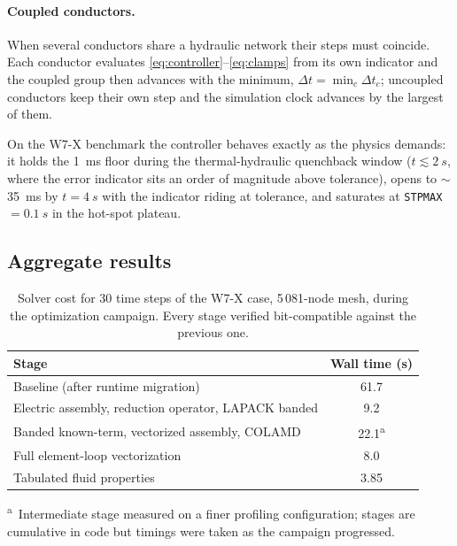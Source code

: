 \documentclass[11pt,a4paper]{article}
\newcommand{\code}[1]{\texttt{#1}}
\begin{document}
\paragraph{Coupled conductors.}
When several conductors share a hydraulic network their steps must coincide.
Each conductor evaluates \eqref{eq:controller}--\eqref{eq:clamps} from its own
indicator and the coupled group then advances with the minimum,
$\Delta t = \min_{c}\Delta t_{c}$; uncoupled conductors keep their own step and
the simulation clock advances by the largest of them.

On the W7-X benchmark the controller behaves exactly as the physics demands: it holds
the \SI{1}{ms} floor during the thermal-hydraulic quenchback window ($t \lesssim
\SI{2}{s}$, where the error indicator sits an order of magnitude above tolerance),
opens to $\sim$\SI{35}{ms} by $t=\SI{4}{s}$ with the indicator riding at tolerance, and
saturates at \code{STPMAX} $=\SI{0.1}{s}$ in the hot-spot plateau.

\subsection{Aggregate results}

\begin{table}[ht]
  \centering
  \caption{Solver cost for 30 time steps of the W7-X case, 5\,081-node mesh,
           during the optimization campaign. Every stage verified bit-compatible
           against the previous one.}
  \label{tab:perf30}
  \begin{tabular}{lS[table-format=2.1]}
    \toprule
    Stage & {Wall time (\si{s})} \\
    \midrule
    Baseline (after runtime migration)                      & 61.7 \\
    Electric assembly, reduction operator, LAPACK banded    &  9.2 \\
    Banded known-term, vectorized assembly, COLAMD          & 22.1\textsuperscript{a} \\
    Full element-loop vectorization                          &  8.0 \\
    Tabulated fluid properties                               &  3.85 \\
    \bottomrule
  \end{tabular}

  \vspace{2pt}
  {\footnotesize \textsuperscript{a}~Intermediate stage measured on a finer
  profiling configuration; stages are cumulative in code but timings were taken as
  the campaign progressed.}
\end{table}
\end{document}
